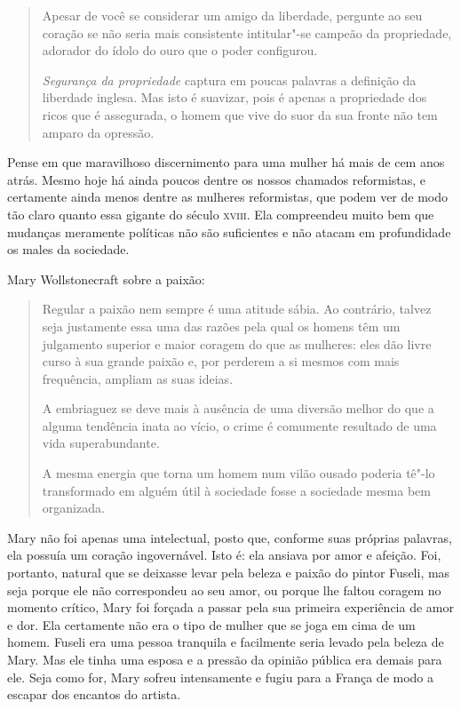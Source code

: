 \begin{quote}
Apesar de você se considerar um amigo da liberdade, pergunte ao seu
coração se não seria mais consistente intitular"-se campeão da
propriedade, adorador do ídolo do ouro que o poder configurou.

\textit{Segurança da propriedade} captura em poucas palavras a definição da
liberdade inglesa. Mas isto é suavizar, pois é apenas a propriedade dos
ricos que é assegurada, o homem que vive do suor da sua fronte não tem
amparo da opressão.
\end{quote}

Pense em que maravilhoso discernimento para uma mulher há mais de cem
anos atrás. Mesmo hoje há ainda poucos dentre os nossos chamados
reformistas, e certamente ainda menos dentre as mulheres reformistas,
que podem ver de modo tão claro quanto essa gigante do século \textsc{xviii}.
Ela compreendeu muito bem que mudanças meramente políticas não são
suficientes e não atacam em profundidade os males da sociedade.

Mary Wollstonecraft sobre a paixão:

\begin{quote}
Regular a paixão nem sempre é uma atitude sábia. Ao contrário, talvez
seja justamente essa uma das razões pela qual os homens têm um
julgamento superior e maior coragem do que as mulheres: eles dão livre
curso à sua grande paixão e, por perderem a si mesmos com mais
frequência, ampliam as suas ideias.\label{regular}

A embriaguez se deve mais à ausência de uma diversão melhor do que a
alguma tendência inata ao vício, o crime é comumente resultado de uma
vida superabundante.

A mesma energia que torna um homem num vilão ousado poderia tê"-lo
transformado em alguém útil à sociedade fosse a sociedade mesma bem
organizada.
\end{quote}

Mary não foi apenas uma intelectual, posto que, conforme suas próprias
palavras, ela possuía um coração ingovernável. Isto é: ela ansiava por
amor e afeição. Foi, portanto, natural que se deixasse levar pela beleza
e paixão do pintor Fuseli, mas seja porque ele não correspondeu ao seu
amor, ou porque lhe faltou coragem no momento crítico, Mary foi forçada
a passar pela sua primeira experiência de amor e dor. Ela certamente não
era o tipo de mulher que se joga em cima de um homem. Fuseli era uma
pessoa tranquila e facilmente seria levado pela beleza de Mary. Mas ele
tinha uma esposa e a pressão da opinião pública era demais para ele.
Seja como for, Mary sofreu intensamente e fugiu para a França de modo a
escapar dos encantos do artista.

